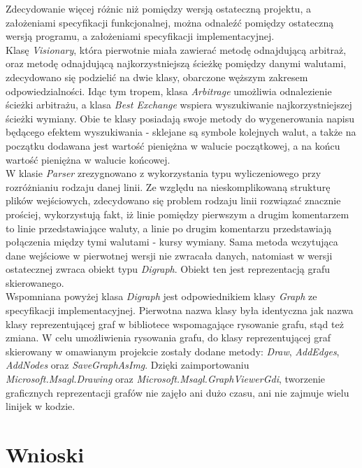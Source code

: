 \documentclass[a4paper,12pt]{article}
\newcommand\tab[1][0.6cm]{\hspace*{#1}}
\begin{document}
\tab Zdecydowanie więcej różnic niż pomiędzy wersją ostateczną projektu, a założeniami specyfikacji funkcjonalnej, można odnaleźć pomiędzy ostateczną wersją programu, a założeniami specyfikacji implementacyjnej. 
\\\tab Klasę \textit{Visionary}, która pierwotnie miała zawierać metodę odnajdującą arbitraż, oraz metodę odnajdującą najkorzystniejszą ścieżkę pomiędzy danymi walutami, zdecydowano się podzielić na dwie klasy, obarczone węższym zakresem odpowiedzialności. Idąc tym tropem, klasa \textit{Arbitrage} umożliwia odnalezienie ścieżki arbitrażu, a klasa \textit{Best Exchange} wspiera wyszukiwanie najkorzystniejszej ścieżki wymiany. Obie te klasy posiadają swoje metody do wygenerowania napisu będącego efektem wyszukiwania - sklejane są symbole kolejnych walut, a także na początku dodawana jest wartość pieniężna w walucie początkowej, a na końcu wartość pieniężna w walucie końcowej. 
\\\tab W klasie \textit{Parser} zrezygnowano z wykorzystania typu wyliczeniowego przy rozróżnianiu rodzaju danej linii. Ze względu na nieskomplikowaną strukturę plików wejściowych, zdecydowano się problem rodzaju linii rozwiązać znacznie prościej, wykorzystują fakt, iż linie pomiędzy pierwszym a drugim komentarzem to linie przedstawiające waluty, a linie po drugim komentarzu przedstawiają połączenia między tymi walutami - kursy wymiany. Sama metoda wczytująca dane wejściowe w pierwotnej wersji nie zwracała danych, natomiast w wersji ostatecznej zwraca obiekt typu \textit{Digraph}. Obiekt ten jest reprezentacją grafu skierowanego.
\\\tab Wspomniana powyżej klasa \textit{Digraph} jest odpowiednikiem klasy \textit{Graph} ze specyfikacji implementacyjnej. Pierwotna nazwa klasy była identyczna jak nazwa klasy reprezentującej graf w bibliotece wspomagające rysowanie grafu, stąd też zmiana. W celu umożliwienia rysowania grafu, do klasy reprezentującej graf skierowany w omawianym projekcie zostały dodane metody: \textit{Draw}, \textit{AddEdges}, \textit{AddNodes} oraz \textit{SaveGraphAsImg}. Dzięki zaimportowaniu \textit{Microsoft.Msagl.Drawing} oraz \textit{Microsoft.Msagl.GraphViewerGdi}, tworzenie graficznych reprezentacji grafów nie zajęło ani dużo czasu, ani nie zajmuje wielu linijek w kodzie.
\section{Wnioski}
\end{document}
